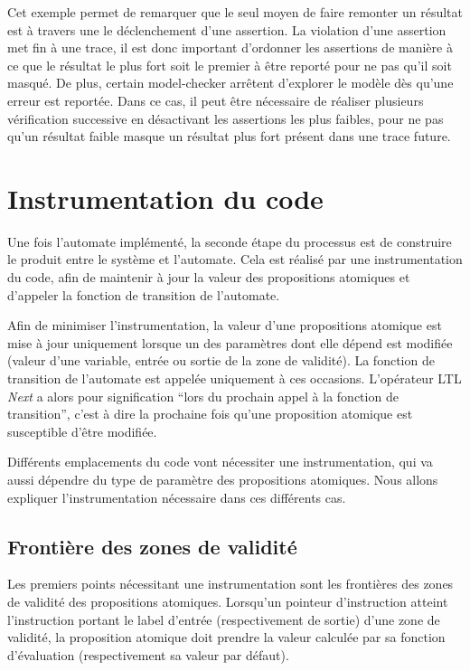 Cet exemple permet de remarquer que le seul moyen de faire remonter un résultat
est à travers une le déclenchement d'une assertion. La violation d'une assertion
met fin à une trace, il est donc important d'ordonner les assertions de manière
à ce que le résultat le plus fort soit le premier à être reporté pour ne pas
qu'il soit masqué. De plus, certain model-checker arrêtent d'explorer le modèle
dès qu'une erreur est reportée. Dans ce cas, il peut être nécessaire de réaliser
plusieurs vérification successive en désactivant les assertions les plus
faibles, pour ne pas qu'un résultat faible masque un résultat plus fort présent
dans une trace future.

\section{Instrumentation du code}

Une fois l'automate implémenté, la seconde étape du processus est de construire
le produit entre le système et l'automate. Cela est réalisé par une
instrumentation du code, afin de maintenir à jour la valeur des propositions
atomiques et d'appeler la fonction de transition de l'automate.

Afin de minimiser l'instrumentation, la valeur d'une propositions atomique est
mise à jour uniquement lorsque un des paramètres dont elle dépend est modifiée
(valeur d'une variable, entrée ou sortie de la zone de validité). La fonction de
transition de l'automate est appelée uniquement à ces occasions. L'opérateur
\ac{LTL} \emph{Next} a alors pour signification ``lors du prochain appel à la
fonction de transition'', c'est à dire la prochaine fois qu'une proposition
atomique est susceptible d'être modifiée.

Différents emplacements du code vont nécessiter une instrumentation, qui va
aussi dépendre du type de paramètre des propositions atomiques. Nous allons
expliquer l'instrumentation nécessaire dans ces différents cas.

\subsection{Frontière des zones de validité}

Les premiers points nécessitant une instrumentation sont les frontières
des zones de validité des propositions atomiques. Lorsqu'un pointeur
d'instruction atteint l'instruction portant le label d'entrée
(respectivement de sortie) d'une zone de validité, la proposition
atomique doit prendre la valeur calculée par sa fonction d'évaluation
(respectivement sa valeur par défaut).

